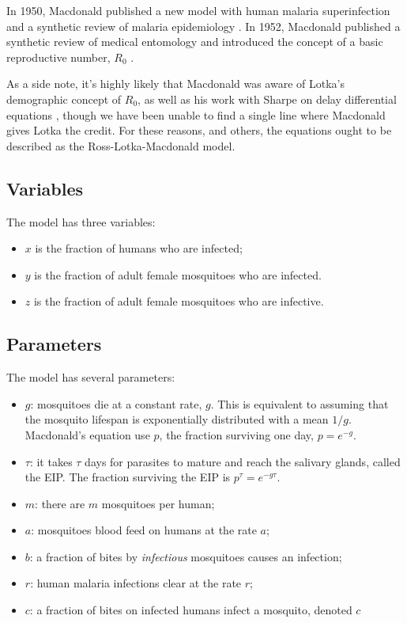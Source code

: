 \documentclass[
]{book}
\begin{document}
In 1950, Macdonald published a new model with human malaria superinfection \autocite{MacdonaldG1950Superinfection} and a synthetic review of malaria epidemiology \autocite{MacdonaldG1950Epidemiology}. In 1952, Macdonald published a synthetic review of medical entomology \autocite{MacdonaldG1952Sporozoite} and introduced the concept of a basic reproductive number, \(R_0\) \autocite{MacdonaldG1952R0}.

As a side note, it's highly likely that Macdonald was aware of Lotka's demographic concept of \(R_0\), as well as his work with Sharpe on delay differential equations \autocite{LotkaAJ1923part4}, though we have been unable to find a single line where Macdonald gives Lotka the credit. For these reasons, and others, the equations ought to be described as the Ross-Lotka-Macdonald model.

\subsection{Variables}\label{variables-1}

The model has three variables:

\begin{itemize}
\item
  \(x\) is the fraction of humans who are infected;
\item
  \(y\) is the fraction of adult female mosquitoes who are infected.
\item
  \(z\) is the fraction of adult female mosquitoes who are infective.
\end{itemize}

\subsection{Parameters}\label{parameters-2}

The model has several parameters:

\begin{itemize}
\item
  \(g\): mosquitoes die at a constant rate, \(g\). This is equivalent to assuming that the mosquito lifespan is exponentially distributed with a mean \(1/g\). Macdonald's equation use \(p\), the fraction surviving one day, \(p = e^{-g}\).
\item
  \(\tau\): it takes \(\tau\) days for parasites to mature and reach the salivary glands, called the EIP. The fraction surviving the EIP is \(p^\tau = e^{-g \tau}\).
\item
  \(m\): there are \(m\) mosquitoes per human;
\item
  \(a\): mosquitoes blood feed on humans at the rate \(a\);
\item
  \(b\): a fraction of bites by \emph{infectious} mosquitoes causes an infection;
\item
  \(r\): human malaria infections clear at the rate \(r\);
\item
  \(c\): a fraction of bites on infected humans infect a mosquito, denoted \(c\)
\end{itemize}
\end{document}
